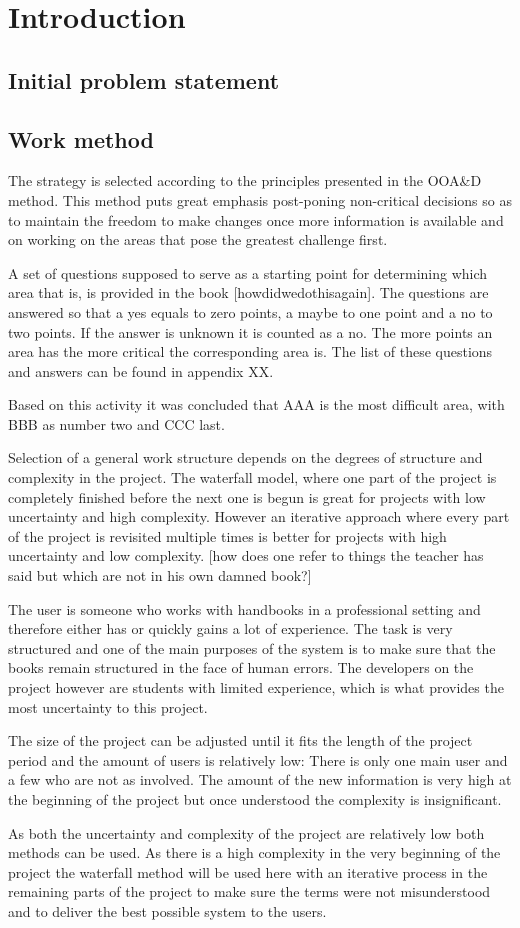 \chapter{Introduction}
\section{Initial problem statement}
\section{Work method}
The strategy is selected according to the principles presented in the OOA&D method. This method puts great emphasis post-poning non-critical decisions so as to maintain the freedom to make changes once more information is available and on working on the areas that pose the greatest challenge first.

A set of questions supposed to serve as a starting point for determining which area that is, is provided in the book [howdidwedothisagain]. The questions are answered so that a yes equals to zero points, a maybe to one point and a no to two points. If the answer is unknown it is counted as a no. The more points an area has the more critical the corresponding area is. The list of these questions and answers can be found in appendix XX.

Based on this activity it was concluded that AAA is the most difficult area, with BBB as number two and CCC last. 

Selection of a general work structure depends on the degrees of structure and complexity in the project. The waterfall model, where one part of the project is completely finished before the next one is begun is great for projects with low uncertainty and high complexity. However an iterative approach where every part of the project is revisited  multiple times is better for projects with high uncertainty and low complexity. [how does one refer to things the teacher has said but which are not in his own damned book?]

The user is someone who works with handbooks in a professional setting and therefore either has or quickly gains a lot of experience. The task is very structured and one of the main purposes of the system is to make sure that the books remain structured in the face of human errors. The developers on the project however are students with limited experience, which is what provides the most uncertainty to this project.

The size of the project can be adjusted until it fits the length of the project period and the amount of users is relatively low: There is only one main user and a few who are not as involved. The amount of the new information is very high at the beginning of the project but once understood the complexity is insignificant.

As both the uncertainty and complexity of the project are relatively low both methods can be used. As there is a high complexity in the very beginning of the project the waterfall method will be used here with an iterative process in the remaining parts of the project to make sure the terms were not misunderstood and to deliver the best possible system to the users.